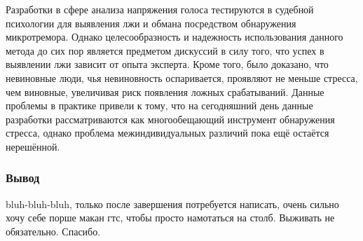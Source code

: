 Разработки в сфере анализа напряжения голоса тестируются в судебной психологии для выявления лжи и обмана посредством обнаружения микротремора. Однако целесообразность и надежность использования данного метода до сих пор является предметом дискуссий в силу того, что успех в выявлении лжи зависит от опыта эксперта. Кроме того, было доказано, что невиновные люди, чья невиновность оспаривается, проявляют не меньше стресса, чем виновные, увеличивая риск появления ложных срабатываний. Данные проблемы в практике привели к тому, что на сегодняшний день данные разработки рассматриваются как многообещающий инструмент обнаружения стресса, однако проблема межиндивидуальных различий пока ещё остаётся нерешённой. \cite{whyMicrophoneIsShit}

\subsubsection*{Вывод}
bluh-bluh-bluh, только после завершения потребуется написать, очень сильно хочу себе порше макан гтс, чтобы просто намотаться на столб. Выживать не обязательно. Спасибо.


\pagebreak